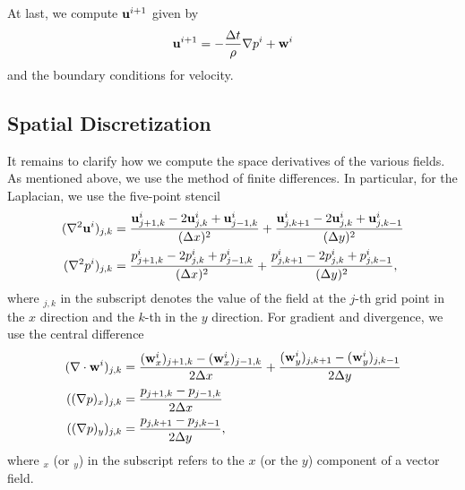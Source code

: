 \documentclass[11pt,a4paper,twoside,openright]{report}
\begin{document}
At last, we compute $\mathbf u^{i+1}$ given by
\begin{align*}
	\mathbf u^{i+1}=-\frac{\Delta t}\rho\nabla p^i+\mathbf w^i
\end{align*}
and the boundary conditions for velocity.

\subsection{Spatial Discretization}\label{sec:sdis}
It remains to clarify how we compute the space derivatives of the various fields. As mentioned above, we use the method of finite differences. In particular, for the Laplacian, we use the five-point stencil
\begin{align*}
	(\nabla^2\mathbf u^i)_{j,k}&=\frac{\mathbf u^i_{j+1,k}-2\mathbf u^i_{j,k}+\mathbf u^i_{j-1,k}}{(\Delta x)^2}+\frac{\mathbf u^i_{j,k+1}-2\mathbf u^i_{j,k}+\mathbf u^i_{j,k-1}}{(\Delta y)^2}\\
	(\nabla^2p^i)_{j,k}&=\frac{p^i_{j+1,k}-2p^i_{j,k}+p^i_{j-1,k}}{(\Delta x)^2}+\frac{p^i_{j,k+1}-2p^i_{j,k}+p^i_{j,k-1}}{(\Delta y)^2},
\end{align*}
where ${}_{j,k}$ in the subscript denotes the value of the field at the $j$-th grid point in the $x$ direction and the $k$-th in the $y$ direction. For gradient and divergence, we use the central difference
\begin{align*}
	(\nabla\cdot\mathbf w^i)_{j,k}&=\frac{(\mathbf w^i_x)_{j+1,k}-(\mathbf w^i_x)_{j-1,k}}{2\Delta x}+\frac{(\mathbf w^i_y)_{j,k+1}-(\mathbf w^i_y)_{j,k-1}}{2\Delta y}\\
	((\nabla p)_x)_{j,k}&=\frac{p_{j+1,k}-p_{j-1,k}}{2\Delta x}\\
	((\nabla p)_y)_{j,k}&=\frac{p_{j,k+1}-p_{j,k-1}}{2\Delta y},
\end{align*}
where ${}_x$ (or ${}_y$) in the subscript refers to the $x$ (or the $y$) component of a vector field.
\end{document}
